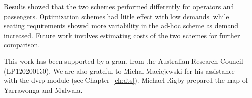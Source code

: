 Results showed that the two schemes performed differently for operators and
passengers. Optimization schemes had little effect with low demands, while
seating requirements showed more variability in the ad-hoc scheme as demand
increased. Future work involves estimating costs of the two schemes for further
comparison.

This work has been supported by a grant from the Australian Research Council (LP120200130). We are also grateful to Michal Maciejewski for his assistance with the dvrp module (see Chapter~\ref{ch:dts}). Michael Rigby prepared the map of Yarrawonga and Mulwala.
